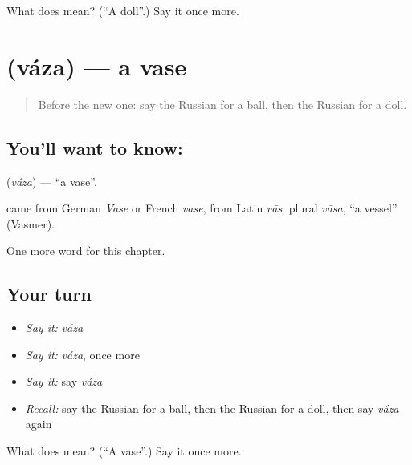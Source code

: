 \begin{tcolorbox}[breakable,colback=teal!4,colframe=teal!35!black,title={Before you move on}]
What does  mean? (\textquotedblleft{}A doll\textquotedblright{}.) Say it once more.
\end{tcolorbox}
\section[\texorpdfstring{\ru{ваза} (váza)}{ваза (váza)}]{ (váza) — a vase}

\label{lesson:RU-C221-vaza}



\begin{quote}
Before the new one: say the Russian for a ball, then the Russian for a doll.
\end{quote}

\subsection*{You'll want to know: }
\textbf{} (\emph{váza}) — \textquotedblleft{}a vase\textquotedblright{}.

\begin{cousinweb}
\textbf{} came from German \emph{Vase} or French \emph{vase}, from Latin \emph{vās}, plural \emph{vāsa}, \textquotedblleft{}a vessel\textquotedblright{} (Vasmer).
\end{cousinweb}

\begin{grammarlens}[title={What you've built}]
One more word for this chapter.
\end{grammarlens}

\subsection*{Your turn}
\begin{itemize}
\raggedright
  \item \emph{Say it:} \emph{váza}
  \item \emph{Say it:} \emph{váza}, once more
  \item \emph{Say it:} say \emph{váza}
  \item \emph{Recall:} say the Russian for a ball, then the Russian for a doll, then say \emph{váza} again
\end{itemize}

\begin{tcolorbox}[breakable,colback=teal!4,colframe=teal!35!black,title={Before you move on}]
What does  mean? (\textquotedblleft{}A vase\textquotedblright{}.) Say it once more.
\end{tcolorbox}
